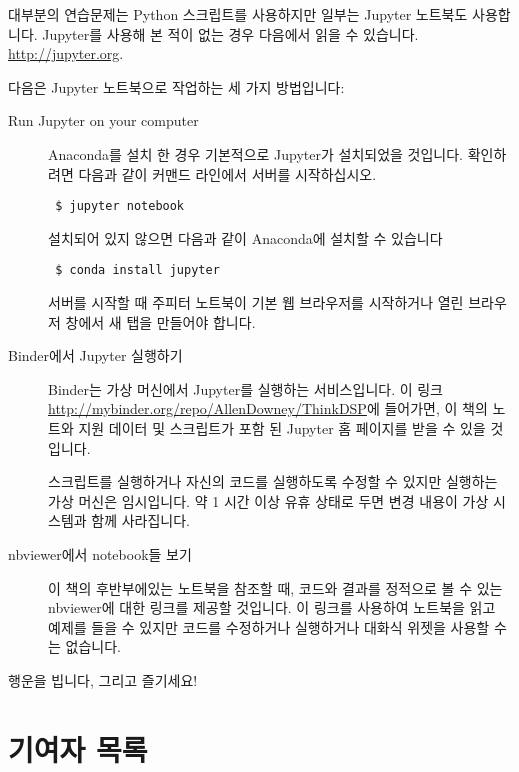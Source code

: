 \documentclass[12pt]{book} \usepackage[width=5.5in,height=8.5in, hmarginratio=3:2,vmarginratio=1:1]{geometry}
\begin{document}
대부분의 연습문제는 Python 스크립트를 사용하지만 일부는 Jupyter 노트북도 사용합니다. Jupyter를 사용해 본 적이 없는 경우 다음에서 읽을 수 있습니다. \url{http://jupyter.org}.  

다음은 Jupyter 노트북으로 작업하는 세 가지 방법입니다: 

\begin{description} 

\item[Run Jupyter on your computer] 

Anaconda를 설치 한 경우 기본적으로 Jupyter가 설치되었을 것입니다. 확인하려면 다음과 같이 커맨드 라인에서 서버를 시작하십시오. 

\begin{verbatim} $ jupyter notebook \end{verbatim} 

설치되어 있지 않으면 다음과 같이 Anaconda에 설치할 수 있습니다 

\begin{verbatim} $ conda install jupyter \end{verbatim} 

서버를 시작할 때 주피터 노트북이 기본 웹 브라우저를 시작하거나 열린 브라우저 창에서 새 탭을 만들어야 합니다. 

\item[Binder에서 Jupyter 실행하기] 

Binder는 가상 머신에서 Jupyter를 실행하는 서비스입니다. 이 링크\url{http://mybinder.org/repo/AllenDowney/ThinkDSP}에 들어가면, 이 책의 노트와 지원 데이터 및 스크립트가 포함 된 Jupyter 홈 페이지를 받을 수 있을 것입니다. 

스크립트를 실행하거나 자신의 코드를 실행하도록 수정할 수 있지만 실행하는 가상 머신은 임시입니다. 약 1 시간 이상 유휴 상태로 두면 변경 내용이 가상 시스템과 함께 사라집니다. 

\item[nbviewer에서 notebook들 보기] 

이 책의 후반부에있는 노트북을 참조할 때, 코드와 결과를 정적으로 볼 수 있는 nbviewer에 대한 링크를 제공할 것입니다. 이 링크를 사용하여 노트북을 읽고 예제를 들을 수 있지만 코드를 수정하거나 실행하거나 대화식 위젯을 사용할 수는 없습니다. 

\end{description} 

행운을 빕니다, 그리고 즐기세요! 

\section*{기여자 목록} 
\end{document}
